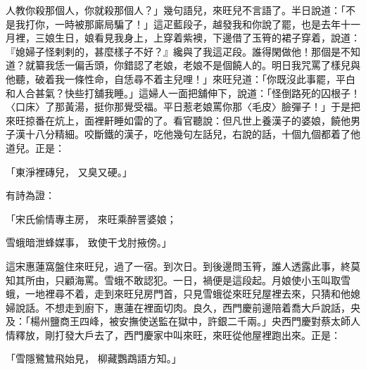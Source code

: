 人教你殺那個人，你就殺那個人？」幾句語兒，來旺兒不言語了。半日說道：「不是我打你，一時被那廝局騙了！」這疋藍段子，越發我和你說了罷，也是去年十一月裡，三娘生日，娘看見我身上，上穿着紫襖，下邊借了玉筲的裙子穿着，說道：『媳婦子怪剌剌的，甚麼樣子不好？』纔與了我這疋段。誰得閑做他！那個是不知道？就纂我恁一偏舌頭，你錯認了老娘，老娘不是個饒人的。明日我咒罵了樣兒與他聽，破着我一條性命，自恁尋不着主兒哩！」來旺兒道：「你既沒此事罷，平白和人合甚氣？快些打舖我睡。」這婦人一面把舖伸下，說道：「怪倒路死的囚根子！〈口床〉了那黃湯，挺你那覺受福。平日惹老娘罵你那〈毛皮〉臉彈子！」于是把來旺掠番在炕上，面裡鼾睡如雷的了。看官聽說：但凡世上養漢子的婆娘，饒他男子漢十八分精細。咬斷鐵的漢子，吃他幾句左話兒，右說的話，十個九個都着了他道兒。正是：

「東淨裡磚兒，  又臭又硬。」

有詩為證：

「宋氏偷情專主房，  來旺乘醉詈婆娘；

雪蛾暗泄蜂媒事，  致使干戈肘掖傍。」

這宋惠蓮窩盤住來旺兒，過了一宿。到次日。到後邊問玉筲，誰人透露此事，終莫知其所由，只顧海罵。雪蛾不敢認犯。一日，禍便是這段起。月娘使小玉叫取雪蛾，一地裡尋不着，走到來旺兒房門首，只見雪蛾從來旺兒屋裡去來，只猜和他媳婦說話。不想走到廚下，惠蓮在裡面切肉。良久，西門慶前邊陪着喬大戶說話，央及：「楊州鹽商王四峰，被安撫使送監在獄中，許銀二千兩。」央西門慶對蔡太師人情釋放，剛打發大戶去了，西門慶家中叫來旺，來旺從他屋裡跑出來。正是：

「雪隱鷺鷥飛始見，  柳藏鸚鵡語方知。」

